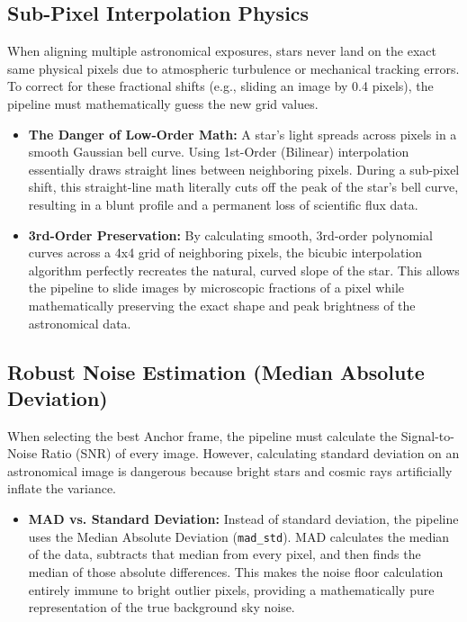 \documentclass[11pt,a4paper]{article}
\begin{document}
\subsection{Sub-Pixel Interpolation Physics}\label{app:interp}
When aligning multiple astronomical exposures, stars never land on the exact same physical pixels due to atmospheric turbulence or mechanical tracking errors. To correct for these fractional shifts (e.g., sliding an image by 0.4 pixels), the pipeline must mathematically guess the new grid values.
\begin{itemize}[leftmargin=*]
    \item \textbf{The Danger of Low-Order Math:} A star's light spreads across pixels in a smooth Gaussian bell curve. Using 1st-Order (Bilinear) interpolation essentially draws straight lines between neighboring pixels. During a sub-pixel shift, this straight-line math literally cuts off the peak of the star's bell curve, resulting in a blunt profile and a permanent loss of scientific flux data.
    \item \textbf{3rd-Order Preservation:} By calculating smooth, 3rd-order polynomial curves across a 4x4 grid of neighboring pixels, the bicubic interpolation algorithm perfectly recreates the natural, curved slope of the star. This allows the pipeline to slide images by microscopic fractions of a pixel while mathematically preserving the exact shape and peak brightness of the astronomical data.
\end{itemize}

\subsection{Robust Noise Estimation (Median Absolute Deviation)}\label{app:mad}
When selecting the best Anchor frame, the pipeline must calculate the Signal-to-Noise Ratio (SNR) of every image. However, calculating standard deviation on an astronomical image is dangerous because bright stars and cosmic rays artificially inflate the variance.
\begin{itemize}[leftmargin=*]
    \item \textbf{MAD vs. Standard Deviation:} Instead of standard deviation, the pipeline uses the Median Absolute Deviation (\texttt{mad\_std}). MAD calculates the median of the data, subtracts that median from every pixel, and then finds the median of those absolute differences. This makes the noise floor calculation entirely immune to bright outlier pixels, providing a mathematically pure representation of the true background sky noise.
\end{itemize}
\end{document}
